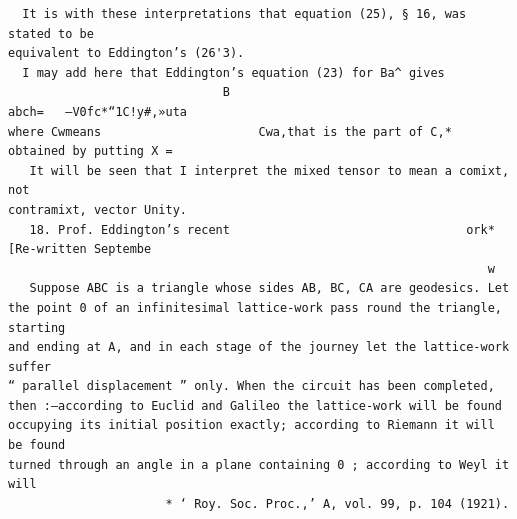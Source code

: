 \documentclass[10pt]{article}
\begin{document}
\begin{verbatim}
  It is with these interpretations that equation (25), § 16, was stated to be
equivalent to Eddington’s (26'3).
  I may add here that Eddington’s equation (23) for Ba^ gives
                              B                                     abch=   —V0fc*“1C!y#,»uta
where Cwmeans                      Cwa,that is the part of C,* obtained by putting X =
   It will be seen that I interpret the mixed tensor to mean a comixt, not
contramixt, vector Unity.
   18. Prof. Eddington’s recent                                 ork*[Re-written Septembe
                                                                   w
   Suppose ABC is a triangle whose sides AB, BC, CA are geodesics. Let
the point 0 of an infinitesimal lattice-work pass round the triangle, starting
and ending at A, and in each stage of the journey let the lattice-work suffer
“ parallel displacement ” only. When the circuit has been completed,
then :—according to Euclid and Galileo the lattice-work will be found
occupying its initial position exactly; according to Riemann it will be found
turned through an angle in a plane containing 0 ; according to Weyl it will
                      * ‘ Roy. Soc. Proc.,’ A, vol. 99, p. 104 (1921).


\end{verbatim}
\clearpage
\end{document}

